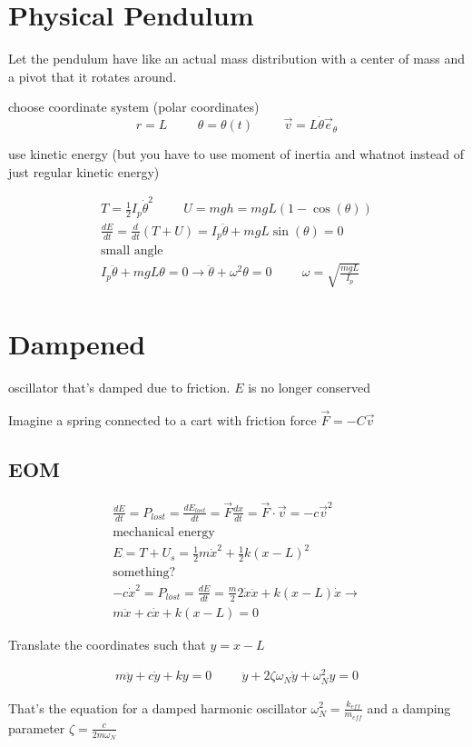 \documentclass[fleqn]{report}
\newcommand{\hp}{\hspace{1cm}}
\newcommand{\equations} [1] {
\begin{gather*}
#1
\end{gather*}
}
\begin{document}
\section{Physical Pendulum}
Let the pendulum have like an actual mass distribution with a center of mass and a pivot that it rotates around. 

choose coordinate system (polar coordinates)
\[
r = L \hp \theta = \theta(t) \hp \vec v = L \dot \theta \vec e_\theta 
\]

use kinetic energy (but you have to use moment of inertia and whatnot instead of just regular kinetic energy)

\equations{
    T = \frac{1}{2} I_p \dot \theta^2
    \hp 
    U = mgh = mgL(1 - \cos(\theta))
    \\
    \frac{dE}{dt} = \frac{d}{dt} (T + U) = I_p \ddot \theta + mgL\sin(\theta) = 0
    \\
    \textrm{small angle}
    \\
    I_p \ddot \theta + mgL\theta = 0
    \rightarrow 
    \ddot \theta + \omega^2 \theta = 0 
    \hp 
    \omega = \sqrt{\frac{mgL}{I_p}}
}

\section{Dampened}
oscillator that's damped due to friction. $E$ is no longer conserved 

Imagine a spring connected to a cart with friction force $\vec F = -C \vec v$

\subsection{EOM}
\equations{
    \frac{dE}{dt} = P_{lost} = \frac{dE_{lost}}{dt} 
    =
    \vec F \frac{dx}{dt} = \vec F \cdot \vec v = -c \vec v^2
    \\
    \textrm{mechanical energy}
    \\
    E = T + U_s = \frac{1}{2} m \dot x^2 + \frac{1}{2} k (x - L)^2
    \\
    \textrm{something?}
    \\
    -c \dot x^2 = P_{lost} = \frac{dE}{dt} =
     \frac{m}{2} 2 \dot x \ddot x + k (x - L) \dot x \rightarrow 
     \\
     m \ddot x  + c \dot x + k (x - L) = 0
}
Translate the coordinates such that $y = x - L$ 

\equations{
    m \ddot y + c \dot y + ky = 0
    \hp 
    \ddot y + 2 \zeta \omega_N \dot y + \omega^2_N y = 0
}
That's the equation for a damped harmonic oscillator $\omega_N^2 = \frac{k_{eff}}{m_{eff}}$ and a damping parameter $\zeta = \frac{c}{2m \omega_N}$
\end{document}
